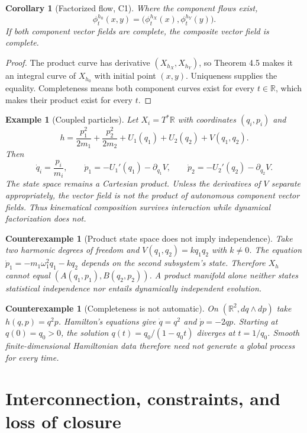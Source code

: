 \documentclass[11pt]{article}
\newtheorem{corollary}[definition]{Corollary}
\newtheorem{counterexample}[definition]{Counterexample}
\newtheorem{example}[definition]{Example}
\newcommand{\R}{\mathbb{R}}
\begin{document}
\begin{corollary}[Factorized flow, C1]
Where the component flows exist,
\[
 \phi_t^{h_0}(x,y)=\bigl(\phi_t^{h_X}(x),\phi_t^{h_Y}(y)\bigr).
\]
If both component vector fields are complete, the composite vector field is complete.
\end{corollary}

\begin{proof}
The product curve has derivative $(X_{h_X},X_{h_Y})$, so Theorem 4.5 makes it an integral curve of $X_{h_0}$ with initial point $(x,y)$. Uniqueness supplies the equality. Completeness means both component curves exist for every $t\in\R$, which makes their product exist for every $t$.
\end{proof}

\begin{example}[Coupled particles]
Let $X_i=T^*\R$ with coordinates $(q_i,p_i)$ and
\[
 h=\frac{p_1^2}{2m_1}+\frac{p_2^2}{2m_2}
   +U_1(q_1)+U_2(q_2)+V(q_1,q_2).
\]
Then
\[
 \dot q_i=\frac{p_i}{m_i},\qquad
 \dot p_1=-U_1'(q_1)-\partial_{q_1}V,
 \qquad
 \dot p_2=-U_2'(q_2)-\partial_{q_2}V.
\]
The state space remains a Cartesian product. Unless the derivatives of $V$ separate appropriately, the vector field is not the product of autonomous component vector fields. Thus kinematical composition survives interaction while dynamical factorization does not.
\end{example}

\begin{counterexample}[Product state space does not imply independence]
Take two harmonic degrees of freedom and $V(q_1,q_2)=kq_1q_2$ with $k\ne0$. The equation $\dot p_1=-m_1\omega_1^2q_1-kq_2$ depends on the second subsystem's state. Therefore $X_h$ cannot equal $(A(q_1,p_1),B(q_2,p_2))$. A product manifold alone neither states statistical independence nor entails dynamically independent evolution.
\end{counterexample}

\begin{counterexample}[Completeness is not automatic]
On $(\R^2,dq\wedge dp)$ take $h(q,p)=q^2p$. Hamilton's equations give $\dot q=q^2$ and $\dot p=-2qp$. Starting at $q(0)=q_0>0$, the solution $q(t)=q_0/(1-q_0t)$ diverges at $t=1/q_0$. Smooth finite-dimensional Hamiltonian data therefore need not generate a global process for every time.
\end{counterexample}

\section{Interconnection, constraints, and loss of closure}
\end{document}
